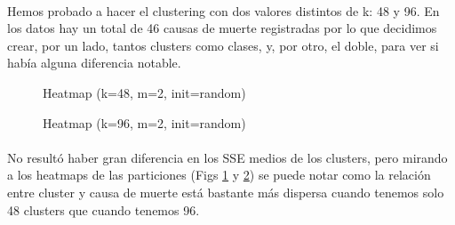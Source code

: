\documentclass[10pt,a4paper]{article}
\begin{document}
	\paragraph{}
	Hemos probado a hacer el clustering con dos valores distintos de k: 48 y 96. En los datos hay un total de 46 causas de muerte registradas por lo que decidimos crear, por un lado, tantos clusters como clases, y, por otro, el doble, para ver si había alguna diferencia notable.
	\begin{figure}
		\centering
		\caption{Heatmap (k=48, m=2, init=random)}
		\label{fig:htm_48_2_random}
	\end{figure}
	\begin{figure}
		\centering
		\caption{Heatmap (k=96, m=2, init=random)}
		\label{fig:htm_96_2_random}
	\end{figure}
	
	\paragraph{}
	No resultó haber gran diferencia en los SSE medios de los clusters, pero mirando a los heatmaps de las particiones (Figs \ref{fig:htm_48_2_random} y \ref{fig:htm_96_2_random}) se puede notar como la relación entre cluster y causa de muerte está bastante más dispersa cuando tenemos solo 48 clusters que cuando tenemos 96.
	
\end{document}
